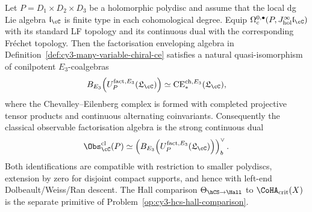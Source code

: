 \begin{proposition}
\label{prop:cy3-continuous-e3-bar-ce}
Let $P=D_1\times D_2\times D_3$ be a holomorphic polydisc and assume
that the local dg Lie algebra $\mathfrak l_{\cC}$ is finite type in each
cohomological degree. Equip
$\Omega^{0,\bullet}_c(P,J^\infty_{\mathrm{hol}}\mathfrak l_{\cC})$ with
its standard LF topology and its continuous dual with the corresponding
Fr\'echet topology. Then the factorisation enveloping algebra in
Definition~\ref{def:cy3-many-variable-chiral-ce} satisfies a natural
quasi-isomorphism of conilpotent $E_3$-coalgebras
\[
 B_{E_3}\!\left(
 U^{\mathrm{fact},E_3}_{P}(\mathfrak L_{\cC})
 \right)
 \simeq
 \mathrm{CE}^{\mathrm{ch},E_3}_*(\mathfrak L_{\cC}),
\]
where the Chevalley--Eilenberg complex is formed with completed
projective tensor products and continuous alternating coinvariants.
Consequently the classical observable factorisation algebra is the
strong continuous dual
\[
 \Obs_{\cC}^{\mathrm{cl}}(P)
 \simeq
 \left(
 B_{E_3}\!\left(
 U^{\mathrm{fact},E_3}_{P}(\mathfrak L_{\cC})
 \right)
 \right)^\vee_b .
\]
Both identifications are compatible with restriction to smaller
polydiscs, extension by zero for disjoint compact supports, and hence
with left-end Dolbeault/Weiss/Ran descent. The Hall comparison
$\Theta_{\hCS\to\Hall}$ to $\CoHA_{\mathrm{crit}}(X)$ is the separate
primitive of
Problem~\ref{op:cy3-hcs-hall-comparison}.
\end{proposition}

